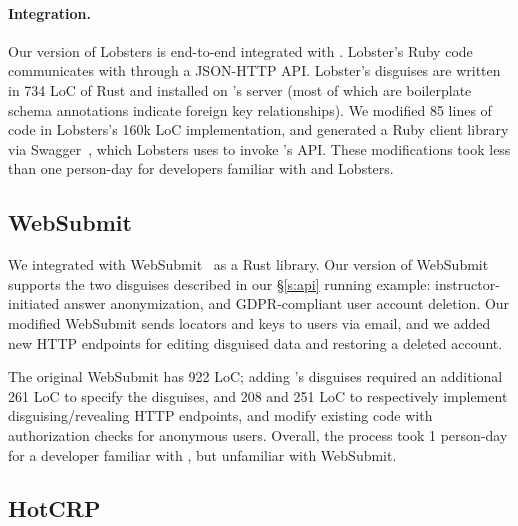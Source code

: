 \paragraph{Integration.}
%
Our version of Lobsters is end-to-end integrated with \sys.
%
Lobster's Ruby code communicates with \sys through a JSON-HTTP API.
Lobster's disguises are written in 734 LoC of Rust and installed on \sys's server (most of which are
boilerplate schema annotations indicate \eg foreign key relationships).
%
We modified 85 lines of code in Lobsters's 160k LoC implementation, and generated a
Ruby client library via Swagger~\cite{swagger}, which Lobsters uses to invoke \sys's
API.
%
These modifications took less than one person-day for developers familiar with
\sys and Lobsters. %
%

\subsection{WebSubmit}
\label{s:case-websubmit}

%
We integrated \sys with WebSubmit~\cite{websubmit-rs-anon} as a Rust library.
%
Our version of WebSubmit supports the two disguises described in our \S\ref{s:api}
running example: instructor-initiated answer anonymization, and GDPR-compliant
user account deletion.
%
Our modified WebSubmit sends locators and keys to users via email, and we added
new HTTP endpoints for editing disguised data and restoring a deleted account.
%

%
The original WebSubmit has 922 LoC; adding \sys's disguises required an additional 261 LoC
to specify the disguises, and 208 and 251 LoC to respectively implement disguising/revealing HTTP
endpoints, and modify existing code with \eg authorization checks for anonymous users.
Overall, the process took 1 person-day for a developer familiar with \sys, but
unfamiliar with WebSubmit.
%

\subsection{HotCRP}
\label{s:case-hotcrp}

